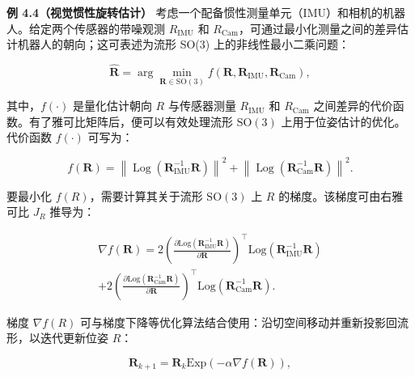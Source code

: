 \textbf{例 4.4（视觉惯性旋转估计）} 考虑一个配备惯性测量单元（IMU）和相机的机器人。给定两个传感器的带噪观测 $R _ { \mathrm { I M U } }$ 和 $R _ { \mathrm { { C a m } } }$，可通过最小化测量之间的差异估计机器人的朝向；这可表述为流形 SO(3) 上的非线性最小二乘问题：

\begin{equation}
\hat {\boldsymbol {R}} = \arg \min _ {\boldsymbol {R} \in \mathrm{SO(3)}} f (\boldsymbol {R}, \boldsymbol {R} _ {\mathrm{IMU}}, \boldsymbol {R} _ {\mathrm{Cam}}),\tag{4.27}
\end{equation}

其中，$f ( \cdot )$ 是量化估计朝向 $R$ 与传感器测量 $R _ { \mathrm { I M U } }$ 和 $R _ { \mathrm { { C a m } } }$ 之间差异的代价函数。有了雅可比矩阵后，便可以有效处理流形 $\mathrm { S O ( 3 ) }$ 上用于位姿估计的优化。代价函数 $f ( \cdot )$ 可写为：

\begin{equation}
f (\boldsymbol {R}) = \left\| \operatorname{Log} \left(\boldsymbol {R} _ {\mathrm{IMU}} ^ {- 1} \boldsymbol {R}\right) \right\| ^ {2} + \left\| \operatorname{Log} \left(\boldsymbol {R} _ {\mathrm{Cam}} ^ {- 1} \boldsymbol {R}\right) \right\| ^ {2}.\tag{4.28}
\end{equation}

要最小化 $f ( R )$，需要计算其关于流形 $\mathrm { S O ( 3 ) }$ 上 $R$ 的梯度。该梯度可由右雅可比 $J _ { R }$ 推导为：

\begin{equation}
\begin{array}{c} \nabla f (\boldsymbol {R}) = 2 \left(\frac {\partial \mathrm{Log} \left(\boldsymbol {R} _ {\mathrm{IMU}} ^ {- 1} \boldsymbol {R}\right)}{\partial \boldsymbol {R}}\right) ^ {\top} \mathrm{Log} \left(\boldsymbol {R} _ {\mathrm{IMU}} ^ {- 1} \boldsymbol {R}\right) \\ + 2 \left(\frac {\partial \mathrm{Log} \left(\boldsymbol {R} _ {\mathrm{Cam}} ^ {- 1} \boldsymbol {R}\right)}{\partial \boldsymbol {R}}\right) ^ {\top} \mathrm{Log} \left(\boldsymbol {R} _ {\mathrm{Cam}} ^ {- 1} \boldsymbol {R}\right). \end{array}\tag{4.29}
\end{equation}

梯度 $\nabla f ( R )$ 可与梯度下降等优化算法结合使用：沿切空间移动并重新投影回流形，以迭代更新位姿 $R$：

\begin{equation}
\boldsymbol {R} _ {k + 1} = \boldsymbol {R} _ {k} \mathrm{Exp} \left(- \alpha \nabla f (\boldsymbol {R})\right),\tag{4.30}
\end{equation}


